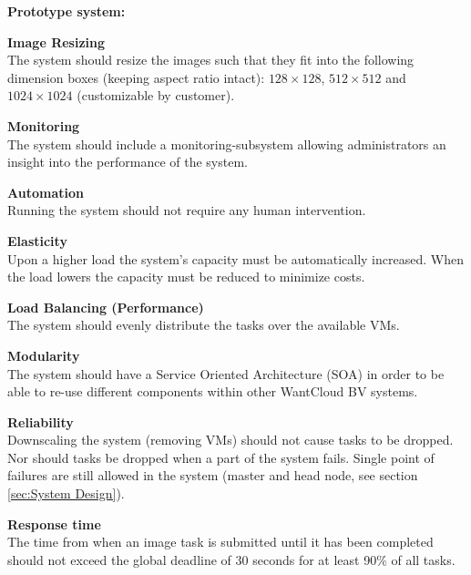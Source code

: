 \documentclass[10pt,journal,compsoc]{IEEEtran}
\makeatletter
\def\nameddisplayedlabel#1#2{
  \label{#1}
  \begingroup
   \def\@currentlabel{#2}%
   \label{#1:name}\endgroup
   \textbf{#2}\hfill\\
}
\makeatother
\begin{document}
\noindent\textbf{Prototype system:}
\begin{enumerate}[leftmargin=1.5cm,label={[FR:\arabic*]}]
  \item\nameddisplayedlabel{fr:resize-image}{Image Resizing}
  The system should resize the images such that they fit into the following
  dimension boxes (keeping aspect
  ratio intact): $128 \times 128$, $512 \times 512$ and $1024 \times 1024$
  (customizable by customer).
  \item\nameddisplayedlabel{fr:monitoring}{Monitoring}
The system should include a monitoring-subsystem allowing
        administrators an insight into the performance of the system.
    \end{enumerate}
\begin{enumerate}[leftmargin=1.5cm,label={[NFR:\arabic*]}]
  \item\nameddisplayedlabel{nfr:automation}{Automation}
    Running the system should not require any human intervention.
  \item\nameddisplayedlabel{nfr:elasticity}{Elasticity}
Upon a higher load the system's capacity must be automatically increased. When
the load lowers the capacity must be reduced to minimize costs.
  \item\nameddisplayedlabel{nfr:load-balancing}{Load Balancing (Performance)}
  The system should evenly distribute the tasks over the available VMs.
  \item\nameddisplayedlabel{nfr:modularity}{Modularity}
  The system should have a Service Oriented Architecture (SOA) in order to be
  able to re-use different components within other WantCloud BV systems. 
  \item\nameddisplayedlabel{nfr:reliability}{Reliability}
Downscaling the system (removing VMs) should not cause tasks to be
        dropped. Nor should tasks be dropped when a part of the system fails.
        Single point of failures are still allowed in the system (master and
        head node, see section
        \ref{sec:System Design}).
  \item\nameddisplayedlabel{nfr:response-time}{Response time}
      The time from when an image task is submitted until it has been completed
      should not exceed the global deadline of 30 seconds for at least 90\% of
      all tasks.
    \end{enumerate}
\end{document}
